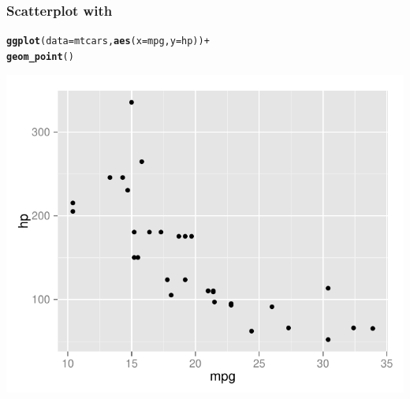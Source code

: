 \documentclass[12pt]{beamer}\usepackage[]{graphicx}\usepackage[]{color}
\makeatletter
\newcommand{\hlopt}[1]{\textcolor[rgb]{0,0,0}{#1}}%
\newcommand{\hlstd}[1]{\textcolor[rgb]{0.345,0.345,0.345}{#1}}%
\newcommand{\hlkwc}[1]{\textcolor[rgb]{0.333,0.667,0.333}{#1}}%
\newcommand{\hlkwd}[1]{\textcolor[rgb]{0.737,0.353,0.396}{\textbf{#1}}}%
\newenvironment{kframe}{%
 \def\at@end@of@kframe{}%
 \ifinner\ifhmode%
  \def\at@end@of@kframe{\end{minipage}}%
  \begin{minipage}{\columnwidth}%
 \fi\fi%
 \def\FrameCommand##1{\hskip\@totalleftmargin \hskip-\fboxsep
 \colorbox{shadecolor}{##1}\hskip-\fboxsep
     \hskip-\linewidth \hskip-\@totalleftmargin \hskip\columnwidth}%
 \MakeFramed {\advance\hsize-\width
   \@totalleftmargin\z@ \linewidth\hsize
   \@setminipage}}%
 {\par\unskip\endMakeFramed%
 \at@end@of@kframe}
\newenvironment{knitrout}{}{} %
\makeatother
\begin{document}
\begin{frame}[fragile]
\frametitle{Scatterplot with }
\begin{knitrout}\scriptsize
{}\color{fgcolor}\begin{kframe}
\begin{alltt}
\hlkwd{ggplot}\hlstd{(}\hlkwc{data} \hlstd{= mtcars,} \hlkwd{aes}\hlstd{(}\hlkwc{x} \hlstd{= mpg,} \hlkwc{y} \hlstd{= hp))} \hlopt{+}
  \hlkwd{geom_point}\hlstd{()}
\end{alltt}
\end{kframe}

{\centering \includegraphics[width=.7\linewidth,height=.6\linewidth]{figure/unnamed-chunk-1-1} 

}



\end{knitrout}
\end{frame}

\end{document}

